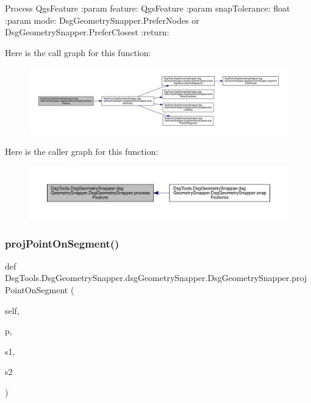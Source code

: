 \begin{DoxyVerb}Process QgsFeature
:param feature: QgsFeature
:param snapTolerance: float
:param mode: DsgGeometrySnapper.PreferNodes or DsgGeometrySnapper.PreferClosest
:return:
\end{DoxyVerb}
 Here is the call graph for this function\+:
\nopagebreak
\begin{figure}[H]
\begin{center}
\leavevmode
\includegraphics[width=350pt]{class_dsg_tools_1_1_dsg_geometry_snapper_1_1dsg_geometry_snapper_1_1_dsg_geometry_snapper_a454e82613c178a7bf1322353d49c50cb_cgraph}
\end{center}
\end{figure}
Here is the caller graph for this function\+:
\nopagebreak
\begin{figure}[H]
\begin{center}
\leavevmode
\includegraphics[width=350pt]{class_dsg_tools_1_1_dsg_geometry_snapper_1_1dsg_geometry_snapper_1_1_dsg_geometry_snapper_a454e82613c178a7bf1322353d49c50cb_icgraph}
\end{center}
\end{figure}
\mbox{\label{class_dsg_tools_1_1_dsg_geometry_snapper_1_1dsg_geometry_snapper_1_1_dsg_geometry_snapper_ab2012cc6e7509f8f00a47bab2dc98b8c}} 
\subsubsection{\texorpdfstring{proj\+Point\+On\+Segment()}{projPointOnSegment()}}
{\footnotesize\ttfamily def Dsg\+Tools.\+Dsg\+Geometry\+Snapper.\+dsg\+Geometry\+Snapper.\+Dsg\+Geometry\+Snapper.\+proj\+Point\+On\+Segment (\begin{DoxyParamCaption}\item[{}]{self,  }\item[{}]{p,  }\item[{}]{s1,  }\item[{}]{s2 }\end{DoxyParamCaption})}


